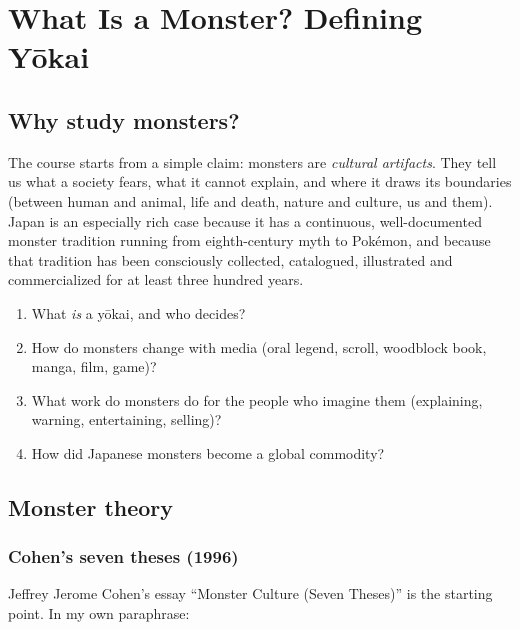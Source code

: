 \chapter{What Is a Monster? Defining Yōkai}

\section{Why study monsters?}

The course starts from a simple claim: monsters are \emph{cultural artifacts}. They tell us
what a society fears, what it cannot explain, and where it draws its boundaries (between
human and animal, life and death, nature and culture, us and them). Japan is an especially
rich case because it has a continuous, well-documented monster tradition running from
eighth-century myth to Pokémon, and because that tradition has been consciously collected,
catalogued, illustrated and commercialized for at least three hundred years.

\begin{important}
\begin{enumerate}
  \item What \emph{is} a yōkai, and who decides?
  \item How do monsters change with media (oral legend, scroll, woodblock book, manga,
        film, game)?
  \item What work do monsters do for the people who imagine them (explaining, warning,
        entertaining, selling)?
  \item How did Japanese monsters become a global commodity?
\end{enumerate}
\end{important}

\section{Monster theory}

\subsection{Cohen's seven theses (1996)}

Jeffrey Jerome Cohen's essay ``Monster Culture (Seven Theses)'' is the starting point. In
my own paraphrase:

